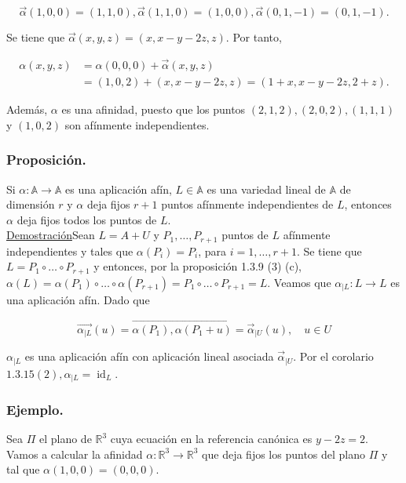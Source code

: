 \documentclass[12pt, a4paper, ones, notitlepage, openany,titlepage]{article}
\newcommand{\demostracion}{\noindent\underline{Demostración}}
\begin{document}
$$
\vec{\alpha}(1,0,0)=(1,1,0), \vec{\alpha}(1,1,0)=(1,0,0), \vec{\alpha}(0,1,-1)=(0,1,-1) .
$$

Se tiene que $\vec{\alpha}(x, y, z)=(x, x-y-2 z, z)$. Por tanto,

$$
\begin{aligned}
\alpha(x, y, z) & =\alpha(0,0,0)+\vec{\alpha}(x, y, z) \\
& =(1,0,2)+(x, x-y-2 z, z)=(1+x, x-y-2 z, 2+z) .
\end{aligned}
$$

Además, $\alpha$ es una afinidad, puesto que los puntos $(2,1,2),(2,0,2),(1,1,1)$ y $(1,0,2)$ son afínmente independientes.

\subsubsection{Proposición.} Si $\alpha: \mathbb{A} \rightarrow \mathbb{A}$ es una aplicación afín, $L\in\mathbb{A}$ es una variedad lineal de $\mathbb{A}$ de dimensión $r$ y $\alpha$ deja fijos $r+1$ puntos afínmente independientes de $L$, entonces $\alpha$ deja fijos todos los puntos de $L$.\\

\demostracion Sean $L=A+U$ y $P_{1}, \ldots, P_{r+1}$ puntos de $L$ afínmente independientes y tales que $\alpha\left(P_{i}\right)=P_{i}$, para $i=1, \ldots, r+1$. Se tiene que $L=P_{1} \circ \ldots \circ P_{r+1}$ y entonces, por la proposición 1.3.9 (3) (c), $\alpha(L)=\alpha\left(P_{1}\right) \circ \ldots \circ \alpha\left(P_{r+1}\right)=P_{1} \circ \ldots \circ P_{r+1}=L$. Veamos que $\alpha_{\mid L}: L \rightarrow L$ es una aplicación afín. Dado que

$$
\overrightarrow{\alpha_{\mid L}}(u)=\overrightarrow{\alpha\left(P_{1}\right), \alpha\left(P_{1}+u\right)}=\vec{\alpha}_{\mid U}(u), \quad u \in U
$$

$\alpha_{\mid L}$ es una aplicación afín con aplicación lineal asociada $\vec{\alpha}_{\mid U}$. Por el corolario $1.3 .15(2), \alpha_{\mid L}=\operatorname{id}_{L}$.

\subsubsection{Ejemplo.} Sea $\Pi$ el plano de $\mathbb{R}^{3}$ cuya ecuación en la referencia canónica es $y-2 z=2$. Vamos a calcular la afinidad $\alpha: \mathbb{R}^{3} \rightarrow \mathbb{R}^{3}$ que deja fijos los puntos del plano $\Pi$ y tal que $\alpha(1,0,0)=(0,0,0)$.
\end{document}
